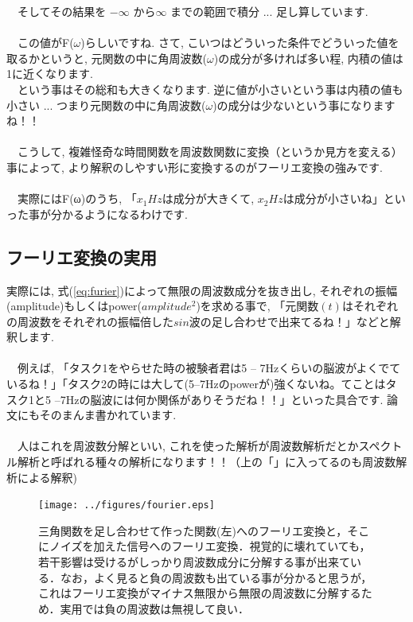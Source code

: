 \documentclass[11pt,a4paper]{ujreport} 	%
\begin{document}
　そしてその結果を $-\infty$ から$\infty$ までの範囲で積分 ... 足し算しています.\\\\
　この値がF($\omega$)らしいですね. さて, こいつはどういった条件でどういった値を取るかというと, 元関数の中に角周波数($\omega$)の成分が多ければ多い程, 内積の値は1に近くなります. \\
　という事はその総和も大きくなります. 逆に値が小さいという事は内積の値も小さい ... つまり元関数の中に角周波数($\omega$)の成分は少ないという事になりますね！！\\
\\
　こうして, 複雑怪奇な時間関数を周波数関数に変換（というか見方を変える）事によって, より解釈のしやすい形に変換するのがフーリエ変換の強みです.\\
\\
　実際にはF(ω)のうち, 「$x_1Hz$は成分が大きくて, $x_2Hz$は成分が小さいね」といった事が分かるようになるわけです.
\subsection{フーリエ変換の実用}
実際には, 式(\ref{eq:furier})によって無限の周波数成分を抜き出し, それぞれの振幅(amplitude)もしくはpower($amplitude^2$)を求める事で, 「元関数$(t)$はそれぞれの周波数をそれぞれの振幅倍した$sin$波の足し合わせで出来てるね！」などと解釈します.\\\\
　例えば, 「タスク1をやらせた時の被験者君は5 -- 7Hzくらいの脳波がよくでているね！」「タスク2の時には大して(5--7Hzのpowerが)強くないね。てことはタスク1と5 --7Hzの脳波には何か関係がありそうだね！！」といった具合です. 論文にもそのまんま書かれています.
\\\\
　人はこれを周波数分解といい, これを使った解析が周波数解析だとかスペクトル解析と呼ばれる種々の解析になります！！（上の「」に入ってるのも周波数解析による解釈)\\

\begin{figure}[H]
  \centering
  \texttt{[image: ../figures/fourier.eps]}
  \caption{三角関数を足し合わせて作った関数(左)へのフーリエ変換と，そこにノイズを加えた信号へのフーリエ変換．視覚的に壊れていても，若干影響は受けるがしっかり周波数成分に分解する事が出来ている．なお，よく見ると負の周波数も出ている事が分かると思うが，これはフーリエ変換がマイナス無限から無限の周波数に分解するため．実用では負の周波数は無視して良い．}
\end{figure}
\end{document}
